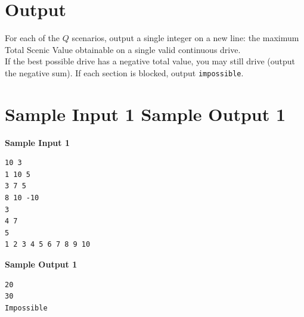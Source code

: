 \documentclass[11pt, a4paper]{article}
\begin{document}
\section*{Output}

For each of the $Q$ scenarios, output a single integer on a new line: the maximum Total Scenic Value obtainable on a single valid continuous drive. \\ 

\noindent If the best possible drive has a negative total value, you may still drive (output the negative sum). If each section is blocked, output \verb|impossible|.

\section*{Sample Input 1	Sample Output 1}

\vspace{10pt}
\noindent \textbf{\large Sample Input 1}
\begin{verbatim}
10 3
1 10 5
3 7 5
8 10 -10
3
4 7 
5
1 2 3 4 5 6 7 8 9 10
\end{verbatim}

\vspace{10pt}
\noindent \textbf{\large Sample Output 1}
\begin{verbatim}
20
30
Impossible
\end{verbatim}

\newpage
\end{document}
